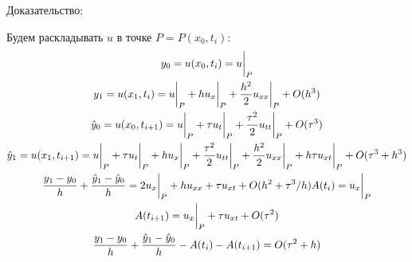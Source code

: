 \documentclass[12pt, a4paper]{article}
\begin{document}
\begin{enumerate}
		
		Доказательство:
		
		Будем раскладывать $u$ в точке $P = P(x_0, t_{i})$:
		\begin{gather}
			y_0 = u(x_0, t_i) = u\bigg|_P \notag \\
			y_1 = u(x_{1}, t_{i}) = u\bigg|_P + h u_x\bigg|_P + \dfrac{h^2}{2} u_{xx}\bigg|_P + O(h^3) \notag \\
			\hat{y}_0 = u(x_{0}, t_{i+1}) = u\bigg|_P + \tau u_t\bigg|_P + \dfrac{\tau^2}{2} u_{tt}\bigg|_P + O(\tau^3) \notag \\
			\hat{y}_1 = u(x_{1}, t_{i+1}) = u\bigg|_P + \tau u_t\bigg|_P + h u_x\bigg|_P + \dfrac{\tau^2}{2} u_{tt}\bigg|_P + \dfrac{h^2}{2} u_{xx}\bigg|_P + h\tau u_{xt}\bigg|_P + O(\tau^3 + h^3) \notag\\
			\dfrac{y_1 - y_0}{h} + \dfrac{\hat{y}_1 - \hat{y}_0}{h} =   2u_x\bigg|_P + h u_{xx} + \tau u_{xt} + O(h^2 + \tau^3 / h) \notag
			A(t_i) = u_x\bigg|_P \notag\\
			A(t_{i+1}) = u_x\bigg|_P + \tau u_{xt} + O(\tau^2) \notag\\
			\dfrac{y_1 - y_0}{h} + \dfrac{\hat{y}_1 - \hat{y}_0}{h} - A(t_i) - A(t_{i+1}) = O(\tau^2 + h)
		\end{gather}
	\end{enumerate}
	
\end{document}
